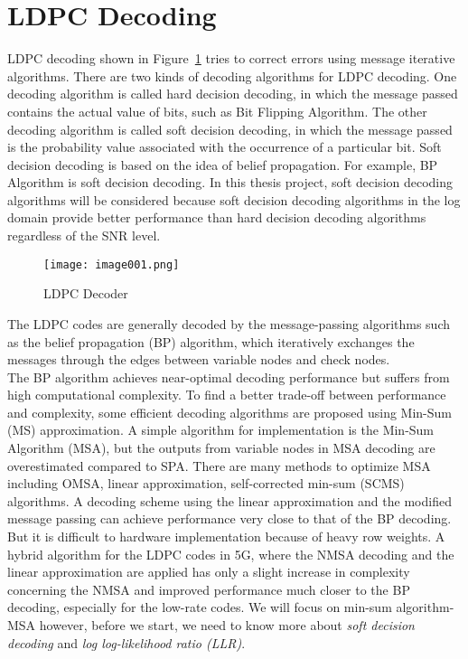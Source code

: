 \section{LDPC Decoding}
\label{sec:LDPC decoding}
LDPC decoding shown in Figure~\ref{fig:LDPC decoder} tries to correct errors using message iterative algorithms. There are two kinds of decoding algorithms for LDPC decoding. One decoding algorithm is called hard decision decoding, in which the message passed contains the actual value of bits, such as Bit Flipping Algorithm. The other decoding algorithm is called soft decision decoding, in which the message passed is the probability value associated with the occurrence of a particular bit. Soft decision decoding is based on the idea of belief propagation. For example, BP Algorithm is soft decision decoding. In this thesis project, soft decision decoding algorithms will be considered because soft decision decoding algorithms in the log domain provide better performance than hard decision decoding algorithms regardless of the SNR level.
\begin{figure}[ht]
    \centering
    \texttt{[image: image001.png]}
    \caption{LDPC Decoder}
    \label{fig:LDPC decoder}
\end{figure}
The LDPC codes are generally decoded by the message-passing algorithms such as the belief propagation (BP) algorithm, which iteratively exchanges the messages through the edges between variable nodes and check nodes. \\
The BP algorithm achieves near-optimal decoding performance but suffers from high computational complexity. To ﬁnd a better trade-oﬀ between performance and complexity, some efficient decoding algorithms are proposed using Min-Sum (MS) approximation. A simple algorithm for implementation is the Min-Sum Algorithm (MSA), but the outputs from variable nodes in MSA decoding are overestimated compared to SPA. There are many methods to optimize MSA including OMSA, linear approximation, self-corrected min-sum (SCMS) algorithms. A decoding scheme using the linear approximation and the modified message passing can achieve performance very close to that of the BP decoding. But it is difficult to hardware implementation because of heavy row weights. A hybrid algorithm for the LDPC codes in 5G, where the NMSA decoding and the linear approximation are applied has only a slight increase in complexity concerning the NMSA and improved performance much closer to the BP decoding, especially for the low-rate codes. We will focus on min-sum algorithm-MSA however, before we start, we need to know more about \emph{soft decision decoding} and \emph{log log-likelihood ratio (LLR)}.

